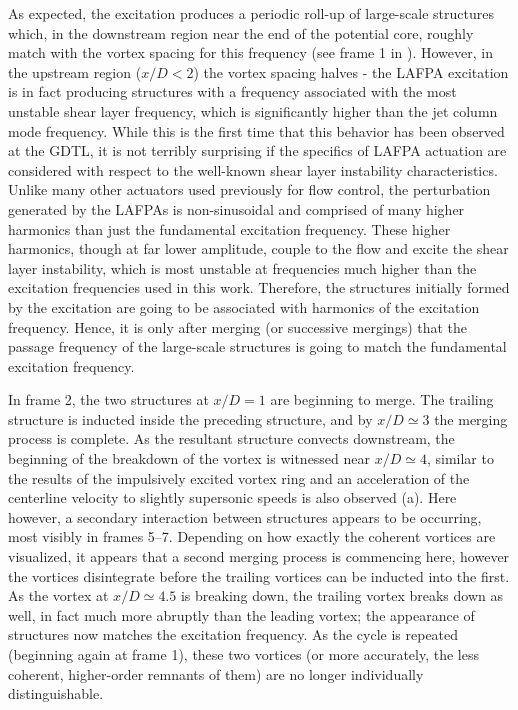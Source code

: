 As expected, the excitation produces a periodic roll-up of large-scale structures which, in the downstream region near the end of the potential core, roughly match with the vortex spacing for this frequency (see frame 1 in ).
However, in the upstream region ($x/D < 2$) the vortex spacing halves - the LAFPA excitation is in fact producing structures with a frequency associated with the most unstable shear layer frequency, which is significantly higher than the jet column mode frequency.
While this is the first time that this behavior has been observed at the GDTL, it is not terribly surprising if the specifics of LAFPA actuation are considered with respect to the well-known shear layer instability characteristics.
Unlike many other actuators used previously for flow control, the perturbation generated by the LAFPAs is non-sinusoidal and comprised of many higher harmonics than just the fundamental excitation frequency.
These higher harmonics, though at far lower amplitude, couple to the flow and excite the shear layer instability, which is most unstable at frequencies much higher than the excitation frequencies used in this work.
Therefore, the structures initially formed by the excitation are going to be associated with harmonics of the excitation frequency.
Hence, it is only after merging (or successive mergings) that the passage frequency of the large-scale structures is going to match the fundamental excitation frequency.

In frame 2, the two structures at $x/D = 1$ are beginning to merge.
The trailing structure is inducted inside the preceding structure, and by $x/D \simeq 3$ the merging process is complete.
As the resultant structure convects downstream, the beginning of the breakdown of the vortex is witnessed near $x/D \simeq 4$, similar to the results of the impulsively excited vortex ring and an acceleration of the centerline velocity to slightly supersonic speeds is also observed (a).
Here however, a secondary interaction between structures appears to be occurring, most visibly in frames 5--7. 
Depending on how exactly the coherent vortices are visualized, it appears that a second merging process is commencing here, however the vortices disintegrate before the trailing vortices can be inducted into the first. 
As the vortex at $x/D \simeq 4.5$ is breaking down, the trailing vortex breaks down as well, in fact much more abruptly than the leading vortex; the appearance of structures now matches the excitation frequency.
As the cycle is repeated (beginning again at frame 1), these two vortices (or more accurately, the less coherent, higher-order remnants of them) are no longer individually distinguishable.

